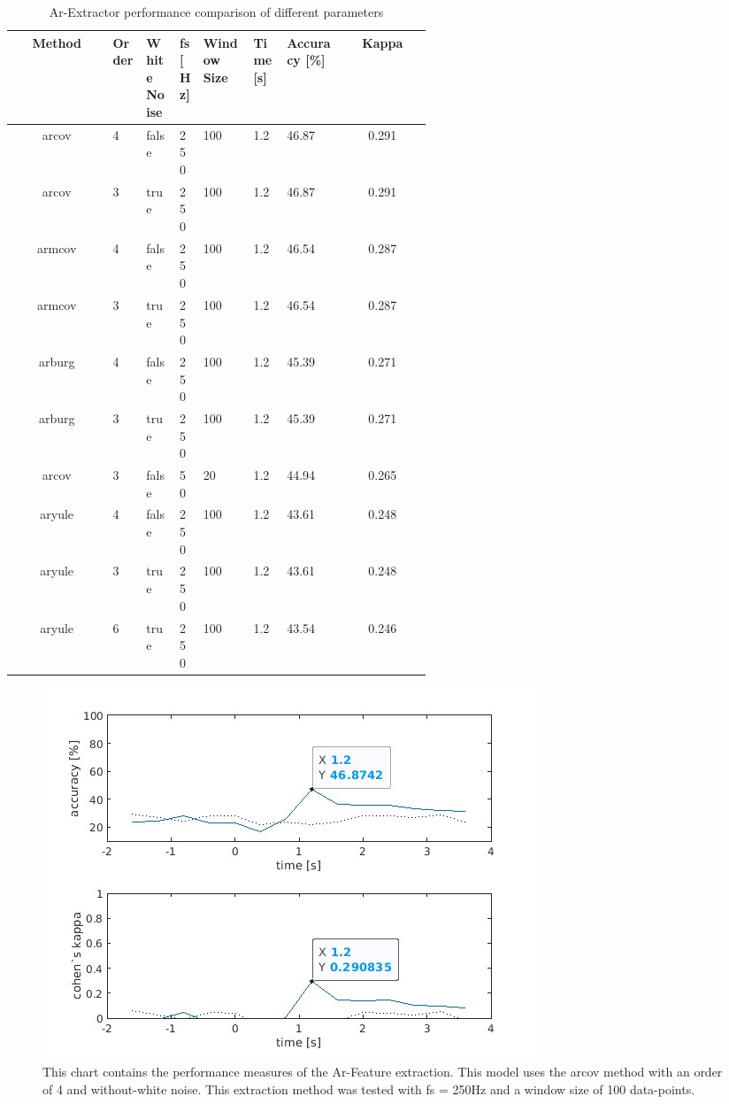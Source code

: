 \documentclass{article}
\begin{document}
\begin{table}[H]
 \centering
 \begin{tabular}{|c|C{0.08\linewidth}|C{0.08\linewidth}|C{0.05\linewidth}|C{0.12\linewidth}|C{0.08\linewidth}|C{0.14\linewidth}|c|}
 \hline
   \textbf{Method} & \textbf{Order} & \centering\textbf{White Noise}  & \textbf{fs [Hz]} & \centering\textbf{Window Size} & \textbf{Time [s]} & \textbf{Accuracy [\%]} & \textbf{Kappa} \\\hline
   arcov  & 4 & false & 250 & 100 & 1.2 & 46.87 & 0.291 \\
   arcov  & 3 & true  & 250 & 100 & 1.2 & 46.87 & 0.291 \\
   armcov & 4 & false & 250 & 100 & 1.2 & 46.54 & 0.287 \\
   armcov & 3 & true  & 250 & 100 & 1.2 & 46.54 & 0.287 \\
   arburg & 4 & false & 250 & 100 & 1.2 & 45.39 & 0.271 \\
   arburg & 3 & true  & 250 & 100 & 1.2 & 45.39 & 0.271 \\
   arcov  & 3 & false & 50  & 20  & 1.2 & 44.94 & 0.265 \\
   aryule & 4 & false & 250 & 100 & 1.2 & 43.61 & 0.248 \\
   aryule & 3 & true  & 250 & 100 & 1.2 & 43.61 & 0.248 \\
   aryule & 6 & true  & 250 & 100 & 1.2 & 43.54 & 0.246 \\\hline
 \end{tabular}
 \caption{Ar-Extractor performance comparison of different parameters}
 \label{tbl:ar-feature-comparison-table}
\end{table} 

\begin{figure}[H]
    \centering
    \includegraphics[width=\textwidth]{46.87-250hz-100-ar-arcov-4-false.jpg}
    \caption{This chart contains the performance measures of the Ar-Feature extraction. This model uses the arcov method with an order of 4 and without-white noise. This extraction method was tested with fs = 250Hz and a window size of 100 data-points.}
\end{figure}
\end{document}
